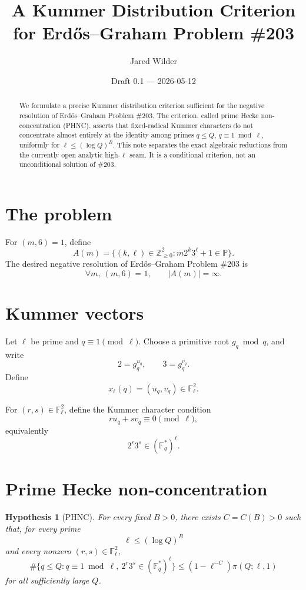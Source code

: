 \documentclass[11pt]{article}
\title{A Kummer Distribution Criterion for Erd\H{o}s--Graham Problem \#203}
\author{Jared Wilder}
\date{Draft 0.1 --- 2026-05-12}
\newtheorem{hypothesis}{Hypothesis}
\newcommand{\Z}{\mathbb Z}
\newcommand{\F}{\mathbb F}
\newcommand{\1}{\mathbf 1}
\begin{document}
\maketitle

\begin{abstract}
We formulate a precise Kummer distribution criterion sufficient for the negative resolution of Erd\H{o}s--Graham Problem \#203.  The criterion, called prime Hecke non-concentration (PHNC), asserts that fixed-radical Kummer characters do not concentrate almost entirely at the identity among primes \(q\le Q\), \(q\equiv1\bmod\ell\), uniformly for \(\ell\le(\log Q)^B\).  This note separates the exact algebraic reductions from the currently open analytic high-\(\ell\) seam.  It is a conditional criterion, not an unconditional solution of \#203.
\end{abstract}

\section{The problem}

For \((m,6)=1\), define
\[
A(m)=\{(k,\ell)\in\Z_{\ge0}^2:m2^k3^\ell+1\in\mathbb P\}.
\]
The desired negative resolution of Erd\H{o}s--Graham Problem \#203 is
\[
\forall m,\ (m,6)=1,\qquad |A(m)|=\infty.
\]

\section{Kummer vectors}

Let \(\ell\) be prime and \(q\equiv1\pmod\ell\).  Choose a primitive root \(g_q\bmod q\), and write
\[
2=g_q^{u_q},\qquad 3=g_q^{v_q}.
\]
Define
\[
x_\ell(q)=(u_q,v_q)\in\F_\ell^2.
\]

For \((r,s)\in\F_\ell^2\), define the Kummer character condition
\[
r u_q+s v_q\equiv0\pmod\ell,
\]
equivalently
\[
2^r3^s\in(\F_q^*)^\ell.
\]

\section{Prime Hecke non-concentration}

\begin{hypothesis}[PHNC]\label{H:phnc}
For every fixed \(B>0\), there exists \(C=C(B)>0\) such that, for every prime
\[
\ell\le(\log Q)^B
\]
and every nonzero \((r,s)\in\F_\ell^2\),
\[
\#\{q\le Q:q\equiv1\bmod\ell,\ 2^r3^s\in(\F_q^*)^\ell\}
\le
(1-\ell^{-C})\pi(Q;\ell,1)
\]
for all sufficiently large \(Q\).
\end{hypothesis}
\end{document}
